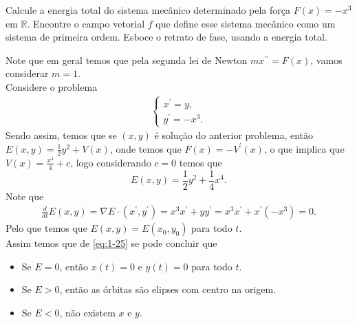 \begin{homeworkProblem}[1-25]
  Calcule a energia total do sistema mecânico determinado pela força $F(x)=-x^3$ em $\mathbb{R}$. Encontre o campo vetorial $f$ que define esse sistema mecânico como um sistema de primeira ordem. Esboce o retrato de fase, usando a energia total.
  \begin{solution}
    Note que em geral temos que pela segunda lei de Newton $mx^{\prime\prime}=F(x)$, vamos considerar $m=1$.\\
    Considere o problema
    \begin{align*}
      \begin{cases}
        x^{\prime}=y \text{,} \\
        y^{\prime}=-x^3.
      \end{cases}
    \end{align*}
    Sendo assim, temos que se $(x,y)$ é solução do anterior problema, então $E(x,y)=\frac{1}{2}y^2+V(x)$, onde temos que $F(x)=-V^{\prime}(x)$, o que implica que $V(x)=\frac{x^4}{4}+c$, logo considerando $c=0$ temos que
    \begin{equation}\label{eq:1-25}
      E(x,y)=\frac{1}{2}y^2+\frac{1}{4}x^{4}.
    \end{equation}
    Note que
    \begin{align*}
      \frac{d}{dt}E(x,y)=\nabla E\cdot (x^{\prime},y^{\prime})=x^{3}x^{\prime}+yy^{\prime}=x^3x^{\prime}+x^{\prime}(-x^3)=0.
    \end{align*}
    Pelo que temos que $E(x,y)=E(x_0,y_0)$ para todo $t$.\\
    Assim temos que de \eqref{eq:1-25} se pode concluir que
    \begin{itemize}
      \item Se $E=0$, então $x(t)=0$ e $y(t)=0$ para todo $t$.
      \item Se $E>0$, então as órbitas são elipses com centro na origem.
      \item Se $E<0$, não existem $x$ e $y$.  
    \end{itemize}
  \end{solution}
\end{homeworkProblem}
